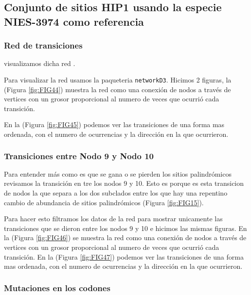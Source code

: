 \documentclass[
]{book}
\begin{document}
\hypertarget{conjunto-de-sitios-hip1-usando-la-especie-nies-3974-como-referencia}{%
\subsection{Conjunto de sitios HIP1 usando la especie NIES-3974 como referencia}\label{conjunto-de-sitios-hip1-usando-la-especie-nies-3974-como-referencia}}

\hypertarget{red-de-transiciones-1}{%
\subsubsection{Red de transiciones}\label{red-de-transiciones-1}}

visualizamos dicha red .

Para visualizar la red usamos la paqueteria \texttt{networkD3}. Hicimos 2 figuras, la (Figura \ref{fig:FIG44}) muestra la red como una conexión de nodos a través de vertices con un grosor proporcional al numero de veces que ocurrió cada transición.

En la (Figura \ref{fig:FIG45}) podemos ver las transiciones de una forma mas ordenada, con el numero de ocurrencias y la dirección en la que ocurrieron.

\hypertarget{transiciones-entre-nodo-9-y-nodo-10-1}{%
\subsubsection{Transiciones entre Nodo 9 y Nodo 10}\label{transiciones-entre-nodo-9-y-nodo-10-1}}

Para entender más como es que se gana o se pierden los sitios palindrómicos revisamos la transición en tre los nodos 9 y 10. Esto es porque es esta transicion de nodos la que separa a los dos subclados entre los que hay una repentino cambio de abundancia de sitios palindrómicos (Figura \ref{fig:FIG15}).

Para hacer esto filtramos los datos de la red para mostrar unicamente las transiciones que se dieron entre los nodos 9 y 10 e hicimos las mismas figuras.
En la (Figura \ref{fig:FIG46}) se muestra la red como una conexión de nodos a través de vertices con un grosor proporcional al numero de veces que ocurrió cada transición. En la (Figura \ref{fig:FIG47}) podemos ver las transiciones de una forma mas ordenada, con el numero de ocurrencias y la dirección en la que ocurrieron.

\hypertarget{mutaciones-en-los-codones-1}{%
\subsubsection{Mutaciones en los codones}\label{mutaciones-en-los-codones-1}}
\end{document}
